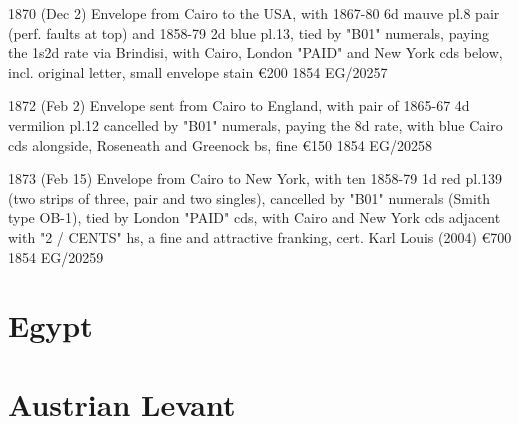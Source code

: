 \documentclass[justified]{tufte-book}
\begin{document}
%
{1870 (Dec 2) Envelope from Cairo to the USA, with 1867-80 6d mauve pl.8 pair (perf. faults at top) and 1858-79 2d blue pl.13, tied by "B01" numerals, paying the 1s2d rate via Brindisi, with Cairo, London "PAID" and New York cds below, incl. original letter, small envelope stain
\euro200
}
{1854}%
{EG/20257}%
{}%
{}
{}%
{}

%
{1872 (Feb 2) Envelope sent from Cairo to England, with pair of 1865-67 4d vermilion pl.12 cancelled by "B01" numerals, paying the 8d rate, with blue Cairo cds alongside, Roseneath and Greenock bs, fine  \euro150
}
{1854}%
{EG/20258}%
{}%
{}
{}%
{}

%
{1873 (Feb 15) Envelope from Cairo to New York, with ten 1858-79 1d red pl.139 (two strips of three, pair and two singles), cancelled by "B01" numerals (Smith type OB-1), tied by London "PAID" cds, with Cairo and New York cds adjacent with "2 / CENTS" hs, a fine and attractive franking, cert. Karl Louis (2004) \euro700
}
{1854}%
{EG/20259}%
{}%
{}
{}%
{}


\chapter{Egypt}















\chapter{Austrian Levant}



\end{document}
